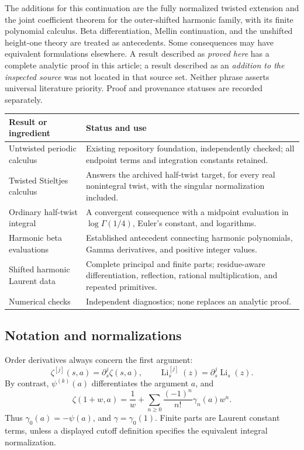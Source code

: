 \documentclass[11pt,letterpaper]{article}
\numberwithin{equation}{section}
\theoremstyle{plain}
\theoremstyle{definition}
\theoremstyle{remark}
\newcommand{\rLi}{\operatorname{Li}}
\begin{document}
The additions for this continuation are the fully normalized twisted
extension and the joint coefficient theorem for the outer-shifted
harmonic family, with its finite polynomial calculus.
Beta differentiation, Mellin continuation, and the unshifted height-one
theory are treated as antecedents. Some consequences may have
equivalent formulations elsewhere. A result described as \emph{proved
here} has a complete analytic proof in this article; a result described
as an \emph{addition to the inspected source} was not located in that
source set. Neither phrase asserts universal literature priority.
Proof and provenance statuses are recorded separately.

\begin{center}
\begin{tabularx}{\textwidth}{@{}p{}X@{}}
\toprule
Result or ingredient & Status and use\\
\midrule
Untwisted periodic calculus &
Existing repository foundation, independently checked; all endpoint
terms and integration constants retained.\\[3pt]
Twisted Stieltjes calculus &
Answers the archived half-twist target, for every real nonintegral
twist, with the singular normalization included.\\[3pt]
Ordinary half-twist integral &
A convergent consequence with a midpoint evaluation in
\(\log\Gamma(1/4)\), Euler's constant, and logarithms.\\[3pt]
Harmonic beta evaluations &
Established antecedent connecting harmonic polynomials, Gamma
derivatives, and positive integer values.\\[3pt]
Shifted harmonic Laurent data &
Complete principal and finite parts; residue-aware differentiation,
reflection, rational multiplication, and repeated primitives.\\[3pt]
Numerical checks &
Independent diagnostics; none replaces an analytic proof.\\
\bottomrule
\end{tabularx}
\end{center}

\subsection{Notation and normalizations}

Order derivatives always concern the first argument:
\[
 \zeta^{[j]}(s,a)=\partial_s^j\zeta(s,a),\qquad
 \rLi_s^{[j]}(z)=\partial_s^j\rLi_s(z).
\]
By contrast, \(\psi^{(k)}(a)\) differentiates the argument \(a\), and
\begin{equation}\label{scope:stieltjes}
 \zeta(1+w,a)=\frac1w+
       \sum_{n\geq0}\frac{(-1)^n}{n!}\gamma_n(a)w^n.
\end{equation}
Thus \(\gamma_0(a)=-\psi(a)\), and \(\gamma=\gamma_0(1)\).
Finite parts are Laurent constant terms, unless a displayed cutoff
definition specifies the equivalent integral normalization.
\end{document}
